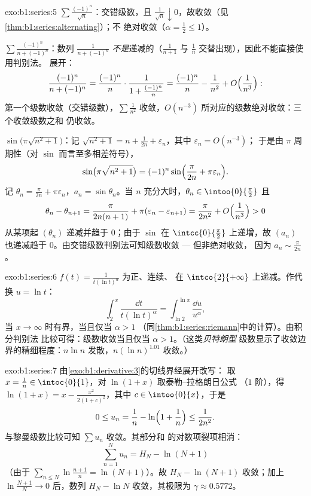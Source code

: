 \begin{solution}{exo:b1:series:5}
$\sum \frac{(-1)^n}{\sqrt n}$：交错级数，且 $\frac{1}{\sqrt n}
\downarrow 0$，故收敛（见\cref{thm:b1:series:alternating}）；不
绝对收敛（$\alpha = \frac12 \leq 1$）。

$\sum \frac{(-1)^n}{n + (-1)^n}$：数列 $\frac{1}{n +
(-1)^n}$ \emph{不是}递减的（$\frac{1}{n+1}$ 与
$\frac{1}{n}$ 交替出现），因此不能直接使用判别法。
展开：
\[
\frac{(-1)^n}{n + (-1)^n}
= \frac{(-1)^n}{n}\cdot\frac{1}{1 + \frac{(-1)^n}{n}}
= \frac{(-1)^n}{n} - \frac{1}{n^2} +
O\Bigl(\frac{1}{n^3}\Bigr):
\]
第一个级数收敛（交错级数），$\sum \frac{1}{n^2}$
收敛，$O(n^{-3})$ 所对应的级数绝对收敛：三个收敛级数之和
仍收敛。

$\sin\bigl(\pi\sqrt{n^2+1}\bigr)$：记 $\sqrt{n^2 + 1} = n +
\frac{1}{2n} + \varepsilon_n$，其中 $\varepsilon_n = O(n^{-3})$；
于是由 $\pi$ 周期性（对 $\sin$ 而言至多相差符号），
\[
\sin\bigl(\pi\sqrt{n^2+1}\bigr)
= (-1)^n \sin\Bigl(\frac{\pi}{2n} + \pi\varepsilon_n\Bigr) .
\]
记 $\theta_n = \frac{\pi}{2n} + \pi\varepsilon_n$，$a_n =
\sin\theta_n$。当 $n$ 充分大时，$\theta_n \in \intoo{0}{\frac\pi2}$
且
\[
\theta_n - \theta_{n+1} = \frac{\pi}{2n(n+1)} +
\pi(\varepsilon_n - \varepsilon_{n+1})
= \frac{\pi}{2n^2} + O\Bigl(\frac{1}{n^3}\Bigr) > 0
\]
从某项起 $(\theta_n)$ 递减并趋于 $0$；由于 $\sin$ 在
$\intcc{0}{\frac\pi2}$ 上递增，故 $(a_n)$ 也递减趋于
$0$。由交错级数判别法可知级数收敛 --- 但非绝对收敛，
因为 $a_n \sim \frac{\pi}{2n}$。
\end{solution}

\begin{solution}{exo:b1:series:6}
$f(t) = \frac{1}{t(\ln t)^\alpha}$ 为正、连续、
在 $\intco{2}{+\infty}$ 上递减。作代换 $u = \ln t$：
\[
\int_2^x \frac{\dd t}{t(\ln t)^\alpha}
= \int_{\ln 2}^{\ln x} \frac{\dd u}{u^\alpha},
\]
当 $x \to \infty$ 时有界，当且仅当 $\alpha > 1$
（同\cref{thm:b1:series:riemann}中的计算）。由积分判别法
比较可得：级数收敛当且仅当 $\alpha > 1$。（这类\emph{贝特朗型}
级数显示了收敛边界的精细程度：$n\ln n$
发散，$n(\ln n)^{1.01}$ 收敛。）
\end{solution}

\begin{solution}{exo:b1:series:7}
由\cref{exo:b1:derivative:3}的切线界经展开改写：
取 $x = \frac1n \in \intoc{0}{1}$，对 $\ln(1+x)$ 取泰勒–拉格朗日公式
（$1$ 阶），得 $\ln(1 + x) = x - \frac{x^2}{2(1 +
c)^2}$，其中 $c \in \intoo{0}{x}$，于是
\[
0 \leq u_n = \frac1n - \ln\Bigl(1 + \frac1n\Bigr) \leq
\frac{1}{2n^2} .
\]
与黎曼级数比较可知 $\sum u_n$ 收敛。其部分和
的对数项裂项相消：
\[
\sum_{n=1}^{N} u_n = H_N - \ln(N+1)
\]
（由于 $\sum_{n\leq N} \ln\frac{n+1}{n} = \ln(N+1)$）。故 $H_N -
\ln(N+1)$ 收敛；加上 $\ln\frac{N+1}{N} \to 0$ 后，数列
$H_N - \ln N$ 收敛，其极限为 $\gamma \approx 0.5772$。
\end{solution}

